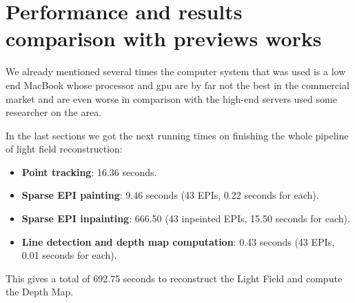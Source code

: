 \section{Performance and results comparison with previews works}

We already mentioned several times the computer system that was used is a low end MacBook whose processor and gpu are by far not the best in the commercial market and are even worse in comparison with the high-end servers used some researcher on the area. 

\bigskip

In the last sections we got the next running times on finishing the whole pipeline of light field reconstruction:

\begin{itemize}
\item \textbf{Point tracking}: 16.36 seconds.
\item \textbf{Sparse EPI painting}: 9.46 seconds (43 EPIs, 0.22 seconds for each).
\item \textbf{Sparse EPI inpainting}: 666.50 (43 inpeinted EPIs, 15.50 seconds for each).
\item \textbf{Line detection and depth map computation}: 0.43 seconds (43 EPIs, 0.01 seconds for each).
\end{itemize}

This gives a total of 692.75 seconds to reconstruct the Light Field and compute the Depth Map. 
